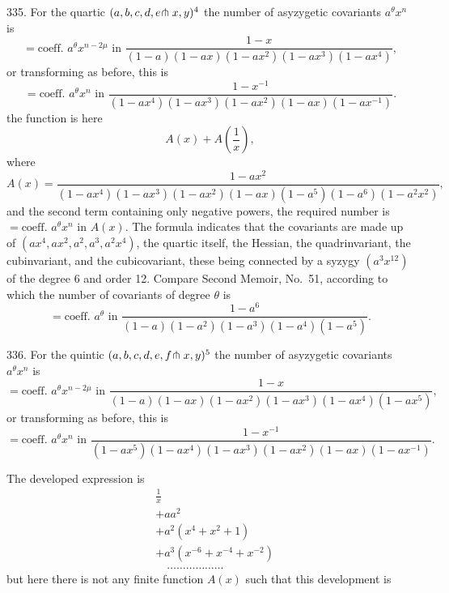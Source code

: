 \documentclass[11pt,a4paper]{article}
\begin{document}
335. For the quartic $(a, b, c, d, e\hspace{-0.2em}\pitchfork x, y)^{4}$ the number of asyzygetic covariants $a^{\theta}x^{n}$ is
\[
= \text{coeff. } a^{\theta}x^{n-2\mu} \text{ in } \frac{1-x}{(1-a)(1-ax)(1-ax^{2})(1-ax^{3})(1-ax^{4})},
\]
or transforming as before, this is
\[
= \text{coeff. } a^{\theta}x^{n} \text{ in } \frac{1-x^{-1}}{(1-ax^{4})(1-ax^{3})(1-ax^{2})(1-ax)(1-ax^{-1})}.
\]
the function is here
\[
A(x) + A\!\left(\frac{1}{x}\right),
\]
where
\[
A(x) = \frac{1-ax^{2}}{(1-ax^{4})(1-ax^{3})(1-ax^{2})(1-ax)(1-a^{5})(1-a^{6})(1-a^{2}x^{2})},
\]
and the second term containing only negative powers, the required number is $= \text{coeff. } a^{\theta}x^{n}$ in $A(x)$. The formula indicates that the covariants are made up of $(ax^{4}, ax^{2}, a^{2}, a^{3}, a^{2}x^{4})$, the quartic itself, the Hessian, the quadrinvariant, the cubinvariant, and the cubicovariant, these being connected by a syzygy $(a^{3}x^{12})$ of the degree 6 and order 12. Compare Second Memoir, No.~51, according to which the number of covariants of degree $\theta$ is
\[
= \text{coeff. } a^{\theta} \text{ in } \frac{1-a^{6}}{(1-a)(1-a^{2})(1-a^{3})(1-a^{4})(1-a^{5})}.
\]

336. For the quintic $(a, b, c, d, e, f\hspace{-0.2em}\pitchfork x, y)^{5}$ the number of asyzygetic covariants $a^{\theta}x^{n}$ is
\[
= \text{coeff. } a^{\theta}x^{n-2\mu} \text{ in } \frac{1-x}{(1-a)(1-ax)(1-ax^{2})(1-ax^{3})(1-ax^{4})(1-ax^{5})},
\]
or transforming as before, this is
\[
= \text{coeff. } a^{\theta}x^{n} \text{ in } \frac{1-x^{-1}}{(1-ax^{5})(1-ax^{4})(1-ax^{3})(1-ax^{2})(1-ax)(1-ax^{-1})}.
\]

\newpage
\setcounter{page}{340}

The developed expression is
\begin{align*}
&\frac{1}{x}\\
&+ aa^{2}\\
&+ a^{2}(x^{4} + x^{2} + 1)\\
&+ a^{3}(x^{-6} + x^{-4} + x^{-2})\\
&\quad\ldots\ldots\ldots\ldots\ldots\ldots
\end{align*}
but here there is not any finite function $A(x)$ such that this development is
\end{document}
